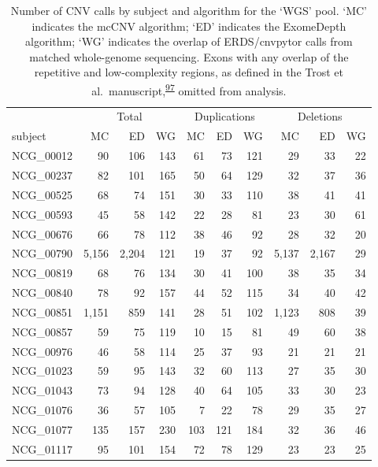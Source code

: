 \documentclass[11pt,letterpaper]{book}
\begin{document}
\begin{table}

\caption[Number of CNV calls by subject and algorithm for the 'WGS' pool.]{\label{tab:wgsCallSbj}Number of CNV calls by subject and algorithm for the `WGS' pool. `MC' indicates the mcCNV algorithm; `ED' indicates the ExomeDepth algorithm; `WG' indicates the overlap of ERDS/cnvpytor calls from matched whole-genome sequencing. Exons with any overlap of the repetitive and low-complexity regions, as defined in the Trost et al.~manuscript,\textsuperscript{\protect\hyperlink{ref-trost:2018aa}{97}} omitted from analysis.}
\centering
\begin{tabular}[t]{lrrrrrrrrr}
\toprule
\multicolumn{1}{c}{ } & \multicolumn{3}{c}{Total} & \multicolumn{3}{c}{Duplications} & \multicolumn{3}{c}{Deletions} \\
\cmidrule(l{3pt}r{3pt}){2-4} \cmidrule(l{3pt}r{3pt}){5-7} \cmidrule(l{3pt}r{3pt}){8-10}
subject & MC & ED & WG & MC & ED & WG & MC & ED & WG\\
\midrule
NCG\_00012 & 90 & 106 & 143 & 61 & 73 & 121 & 29 & 33 & 22\\
NCG\_00237 & 82 & 101 & 165 & 50 & 64 & 129 & 32 & 37 & 36\\
NCG\_00525 & 68 & 74 & 151 & 30 & 33 & 110 & 38 & 41 & 41\\
NCG\_00593 & 45 & 58 & 142 & 22 & 28 & 81 & 23 & 30 & 61\\
NCG\_00676 & 66 & 78 & 112 & 38 & 46 & 92 & 28 & 32 & 20\\
\addlinespace
NCG\_00790 & 5,156 & 2,204 & 121 & 19 & 37 & 92 & 5,137 & 2,167 & 29\\
NCG\_00819 & 68 & 76 & 134 & 30 & 41 & 100 & 38 & 35 & 34\\
NCG\_00840 & 78 & 92 & 157 & 44 & 52 & 115 & 34 & 40 & 42\\
NCG\_00851 & 1,151 & 859 & 141 & 28 & 51 & 102 & 1,123 & 808 & 39\\
NCG\_00857 & 59 & 75 & 119 & 10 & 15 & 81 & 49 & 60 & 38\\
\addlinespace
NCG\_00976 & 46 & 58 & 114 & 25 & 37 & 93 & 21 & 21 & 21\\
NCG\_01023 & 59 & 95 & 143 & 32 & 60 & 113 & 27 & 35 & 30\\
NCG\_01043 & 73 & 94 & 128 & 40 & 64 & 105 & 33 & 30 & 23\\
NCG\_01076 & 36 & 57 & 105 & 7 & 22 & 78 & 29 & 35 & 27\\
NCG\_01077 & 135 & 157 & 230 & 103 & 121 & 184 & 32 & 36 & 46\\
\addlinespace
NCG\_01117 & 95 & 101 & 154 & 72 & 78 & 129 & 23 & 23 & 25\\
\bottomrule
\end{tabular}
\end{table}
\end{document}
